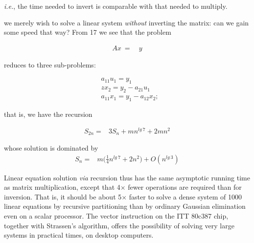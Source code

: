 \textit{i.e.}, the time needed to invert is comparable with that needed to multiply.

 we merely wish to solve a linear system \textit{without} inverting the matrix: can we gain some speed that way? From 17 we
see that the problem

\begin{align*}
Ax\ =&\ y
\end{align*}

reduces to three sub-problems:

\begin{subequations}
\begin{align}
   & a_{11}u_{1} = y_{1}                    \\
   & zx_{2} = y_{2} - a_{21}{u}_1           \\
   & a_{11}x_{1} = y_{1} - a_{12}x_{2}  ;   
\end{align}
\end{subequations}

that is, we have the recursion

\begin{align}
S_{2n} =& 3S_{n} + mn^{lg\ 7} + 2mn^{2}
\end{align}

whose solution is dominated by
\begin{align}
S_{n} =& m\bigg(\frac{1}{4}n^{lg\ 7} + 2n^{2}\bigg) + O(n^{lg\ 3})
\end{align}

Linear equation solution \textit{via} recursion thus has the same asymptotic running time as matrix multiplication, except that 4$\times$ fewer operations are required than for inversion. That is, it should be about 5$\times$ faster to solve a dense system of 1000 linear equations by recursive partitioning than by ordinary Gaussian elimination even on a scalar processor. The vector instruction on the ITT 80c387 chip, together with Strassen's algorithm, offers the possibility of solving very large systems in practical times, on desktop computers.